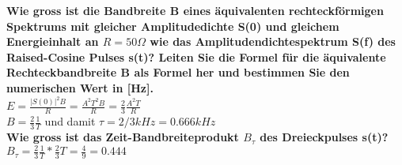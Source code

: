 \textbf{Wie gross ist die Bandbreite B eines äquivalenten rechteckförmigen Spektrums mit gleicher Amplitudedichte S(0) und gleichem Energieinhalt an $R = 50 \Omega$ wie das Amplitudendichtespektrum S(f) des Raised-Cosine Pulses s(t)? Leiten Sie die Formel für die äquivalente Rechteckbandbreite B als Formel her und bestimmen Sie den numerischen Wert in [Hz].}\\
$E=\frac{|S(0)|^2B}{R}=\frac{A^2T^2B}{R}=\frac{2}{3}\frac{A^2T}{R}$\\
$B=\frac{2}{3}\frac{1}{T}$ und damit $\tau = 2/3 kHz = 0.666 kHz$\\

\textbf{Wie gross ist das Zeit-Bandbreiteprodukt $B_{\tau}$ des Dreieckpulses s(t)?}\\
$B_{\tau}=\frac{2}{3}\frac{1}{T}*\frac{2}{3}T=\frac{4}{9}=0.444$